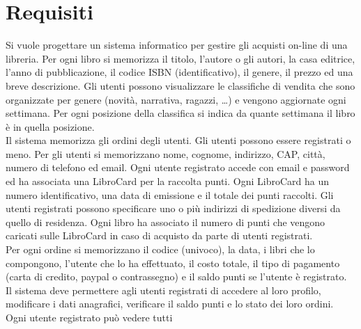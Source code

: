 \documentclass[a4paper,12pt,titlepage]{article}
\begin{document}
\begin{frontespizio}
\end{frontespizio}


\clearpage
\null
\thispagestyle{empty}
\clearpage

\tableofcontents
\thispagestyle{empty}

\clearpage
\null
\thispagestyle{empty}
\clearpage

\setcounter{page}{1}

\section{Requisiti}\label{sec:requisiti}
Si vuole progettare un sistema informatico per gestire gli acquisti on-line di una libreria.
Per ogni libro si memorizza il titolo, l’autore o gli autori, la casa editrice, l’anno di pubblicazione, il
codice ISBN (identificativo), il genere, il prezzo ed una breve descrizione. Gli utenti possono
visualizzare le classifiche di vendita che sono organizzate per genere (novità, narrativa, ragazzi, …)
e vengono aggiornate ogni settimana. Per ogni posizione della classifica si indica da quante
settimana il libro è in quella posizione.\\
Il sistema memorizza gli ordini degli utenti. Gli utenti possono essere registrati o meno. Per gli
utenti si memorizzano nome, cognome, indirizzo, CAP, città, numero di telefono ed email. Ogni
utente registrato accede con email e password ed ha associata una LibroCard per la raccolta punti.
Ogni LibroCard ha un numero identificativo, una data di emissione e il totale dei punti raccolti. Gli
utenti registrati possono specificare uno o più indirizzi di spedizione diversi da quello di residenza.
Ogni libro ha associato il numero di punti che vengono caricati sulle LibroCard in caso di acquisto
da parte di utenti registrati.\\
Per ogni ordine si memorizzano il codice (univoco), la data, i libri che lo compongono, l’utente che
lo ha effettuato, il costo totale, il tipo di pagamento (carta di credito, paypal o contrassegno) e il
saldo punti se l’utente è registrato.\\
Il sistema deve permettere agli utenti registrati di accedere al loro profilo, modificare i dati
anagrafici, verificare il saldo punti e lo stato dei loro ordini. Ogni utente registrato può vedere tutti
\end{document}
